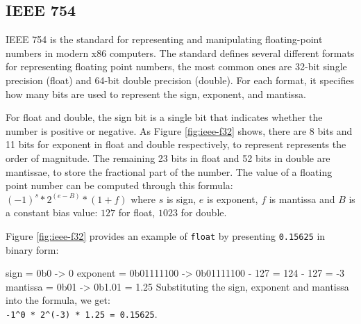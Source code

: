 \documentclass[logo,bsc,singlespacing,parskip]{infthesis}
\newcommand{\dtfloat}{\texttt{float}}
\newenvironment{VerbatimCompact}
  {\vspace*{-2.5mm}\VerbatimEnvironment
   \par\Verbatim}
  {\endVerbatim\vspace*{-2.4mm}}
\begin{document}
\subsection{IEEE 754}
\label{sec:IEEE754}
IEEE 754 is the standard for representing and manipulating floating-point
numbers in modern x86 computers. The standard defines several different formats
for representing floating point numbers, the most common ones are 32-bit single
precision (float) and 64-bit double precision (double). For each format, it
specifies how many bits are used to represent the sign, exponent, and mantissa. 

For float and double, the sign bit is a single bit that indicates whether the
number is positive or negative. As Figure \ref{fig:ieee-f32} shows, there are 8
bits and 11 bits for exponent in float and double respectively, to represent
represents the order of magnitude. The remaining 23 bits in float and 52 bits in
double are mantissae, to store the fractional part of the number. The value of a
floating point number can be computed through this formula: 
\begin{math} (-1)^s * 2^{(e - B)} * (1 + f)\end{math}
where \begin{math}s\end{math} is sign, \begin{math}e\end{math} is exponent, 
\begin{math}f\end{math} is mantissa and \begin{math}B\end{math} is a constant bias
value: \begin{math}127\end{math} for float, \begin{math}1023\end{math} for double. 

Figure \ref{fig:ieee-f32} provides an example of \dtfloat{} by presenting
\texttt{0.15625} in binary form:
\begin{VerbatimCompact}
sign     = 0b0        -> 0
exponent = 0b01111100 -> 0b01111100 - 127 = 124 - 127 = -3
mantissa = 0b01       -> 0b1.01 = 1.25
\end{VerbatimCompact}
Substituting the sign, exponent and mantissa into the formula, we get: \\
\texttt{-1\^{}0 * 2\^{}(-3) * 1.25 = 0.15625}.
\end{document}
